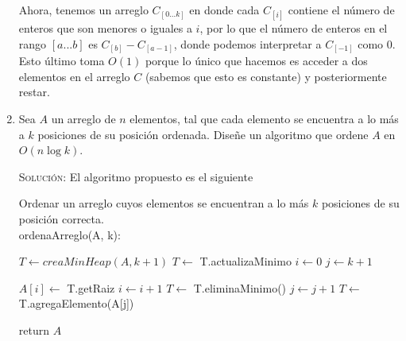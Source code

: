 \documentclass[letterpaper,11pt]{article}
\begin{document}
\begin{enumerate}
    Ahora, tenemos un arreglo $C_{[0...k]}$ en donde cada $C_{[i]}$ contiene el 
    número de enteros que son menores o iguales a $i$, por lo que el número de 
    enteros en el rango $[a...b]$ es $C_{[b]} - C_{[a-1]}$, donde podemos 
    interpretar a $C_{[-1]}$ como $0$. Esto último toma $O(1)$ porque lo único 
    que hacemos es acceder a dos elementos en el arreglo $C$ (sabemos que esto 
    es constante) y posteriormente restar. 

    \item Sea $A$ un arreglo de $n$ elementos, tal que cada elemento se 
    encuentra a lo más a $k$ posiciones de su posición ordenada. Diseñe un 
    algoritmo que ordene $A$ en $O(n \log k)$.

    \textsc{Solución:} El algoritmo propuesto es el siguiente 
    \begin{center}
        \begin{minipage}[c]{0.75\textwidth}
        \begin{algorithm}[H]
            \caption{Ordenar un arreglo cuyos elementos se encuentran a lo más 
                     $k$ posiciones de su posición correcta. \\ 
                     ordenaArreglo(A, k):} 
            \begin{algorithmic}[1]
                \State $T \gets creaMinHeap(A, k+1)$
                \State $T \gets$ T.actualizaMinimo
                \State $i \gets 0$
                \State $j \gets k + 1$

                    \State $A[i] \gets$ T.getRaiz
                    \State $i \gets i + 1$
                    \State $T \gets$ T.eliminaMinimo()
                        \State $j \gets j +1$
                        \State $T \gets$ T.agregaElemento(A[j])
                    \EndIf
                \EndWhile

                \State return $A$
            \end{algorithmic} 
        \end{algorithm}
        \end{minipage}
    \end{center}


\end{enumerate}
\end{document}
